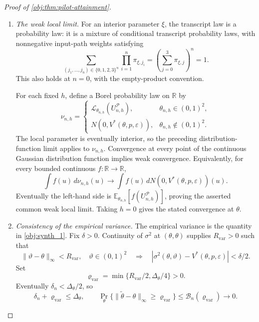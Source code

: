 \documentclass[11pt]{article}
\begin{document}
\begin{proof}[Proof of \cref{obj:thm:pilot-attainment}]
\begin{enumerate}
Both distribution functions lie in \([0,1]\). Splitting the pilot average into the displayed neighborhood and its complement therefore gives, eventually,
\[
\left|
\sum_{\mathbf r}w_{n,h}(\mathbf r)
\mathcal C_{n,h}(x;\vartheta_n(\mathbf r))
-\mathcal G_\theta(x)
\right|
\le a+\mathcal B_n(\beta_n).
\]
Letting \(n\to\infty\), then \(a\downarrow0\), proves
\[
\Pr_{\theta_{n,h}}\{U_{n,h}^{\mathcal P}\le x\}
\longrightarrow\mathcal G_\theta(x)
\qquad(h\in\mathbb R^2,\ x\in\mathbb R).
\]

\item \emph{The weak local limit.}
For an interior parameter \(\xi\), the transcript law is a probability law: it is a mixture of conditional transcript probability laws, with nonnegative input-path weights satisfying
\[
\sum_{(j_1,\ldots,j_n)\in\{0,1,2,3\}^n}
\prod_{i=1}^n\pi_{\xi,j_i}
=\left(\sum_{j=0}^3\pi_{\xi,j}\right)^n=1.
\]
This also holds at \(n=0\), with the empty-product convention.

For each fixed \(h\), define a Borel probability law on \(\mathbb R\) by
\[
\nu_{n,h}=
\begin{cases}
\mathcal L_{\theta_{n,h}}(U_{n,h}^{\mathcal P}),
&\theta_{n,h}\in(0,1)^2,\\
N(0,V^*(\theta,p,\varepsilon)),
&\theta_{n,h}\notin(0,1)^2.
\end{cases}
\]
The local parameter is eventually interior, so the preceding distribution-function limit applies to \(\nu_{n,h}\). Convergence at every point of the continuous Gaussian distribution function implies weak convergence. Equivalently, for every bounded continuous \(f:\mathbb R\to\mathbb R\),
\[
\int f(u)\,d\nu_{n,h}(u)
\longrightarrow
\int f(u)\,dN(0,V^*(\theta,p,\varepsilon))(u).
\]
Eventually the left-hand side is
\(\mathbb E_{\theta_{n,h}}[f(U_{n,h}^{\mathcal P})]\), proving the asserted common weak local limit. Taking \(h=0\) gives the stated convergence at \(\theta\).

\item \emph{Consistency of the empirical variance.}
The empirical variance is the quantity in \cref{obj:synth_1}. Fix \(\delta>0\). Continuity of \(\sigma^2\) at \((\theta,\theta)\) supplies \(R_{\mathrm{var}}>0\) such that
\[
\|\vartheta-\theta\|_\infty<R_{\mathrm{var}},
\quad \vartheta\in(0,1)^2
\quad\Longrightarrow\quad
|\sigma^2(\theta,\vartheta)-V^*(\theta,p,\varepsilon)|<\delta/2.
\]
Set
\[
\varrho_{\mathrm{var}}
=\min\{R_{\mathrm{var}}/2,\Delta_\theta/4\}>0.
\]
Eventually \(\delta_n<\Delta_\theta/2\), so
\[
\delta_n+\varrho_{\mathrm{var}}\le\Delta_\theta,
\qquad
\Pr_\theta\{\|\widetilde\theta-\theta\|_\infty
\ge\varrho_{\mathrm{var}}\}
\le\mathcal B_n(\varrho_{\mathrm{var}})\longrightarrow0.
\]


\end{enumerate}
\end{proof}
\end{document}
